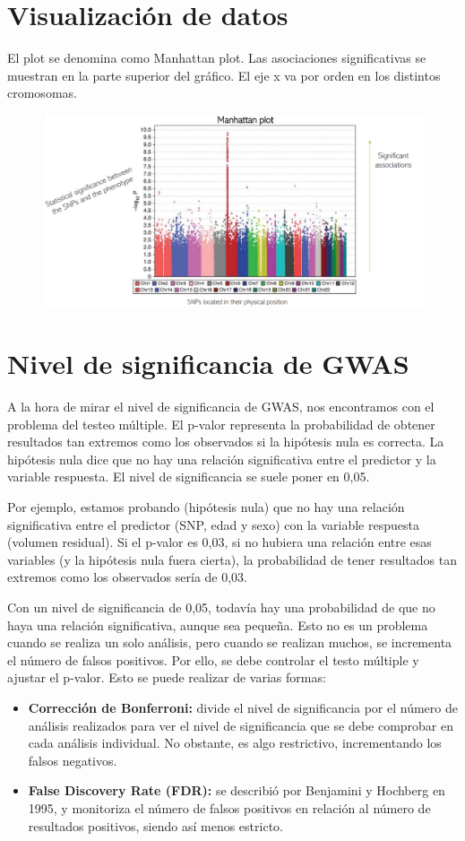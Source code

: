 \section{Visualización de datos}
El plot se denomina como Manhattan plot. Las asociaciones significativas se muestran en la parte superior del gráfico. El eje x va por orden en los distintos cromosomas. 

\begin{figure}[htbp]
\centering
\includegraphics[width = \textwidth]{figs/manhattan-plot.png}
\end{figure}

\section{Nivel de significancia de GWAS}
A la hora de mirar el nivel de significancia de GWAS, nos encontramos con el problema del testeo múltiple. El p-valor representa la probabilidad de obtener resultados tan extremos como los observados si la hipótesis nula es correcta. La hipótesis nula dice que no hay una relación significativa entre el predictor y la variable respuesta. El nivel de significancia se suele poner en 0,05. 

Por ejemplo, estamos probando (hipótesis nula) que no hay una relación significativa entre el predictor (SNP, edad y sexo) con la variable respuesta (volumen residual). Si el p-valor es 0,03, si no hubiera una relación entre esas variables (y la hipótesis nula fuera cierta), la probabilidad de tener resultados tan extremos como los observados sería de 0,03. 

Con un nivel de significancia de 0,05, todavía hay una probabilidad de que no haya una relación significativa, aunque sea pequeña. Esto no es un problema cuando se realiza un solo análisis, pero cuando se realizan muchos, se incrementa el número de falsos positivos. Por ello, se debe controlar el testo múltiple y ajustar el p-valor. Esto se puede realizar de varias formas:
\begin{itemize}
\item \textbf{Corrección de Bonferroni:} divide el nivel de significancia por el número de análisis realizados para ver el nivel de significancia que se debe comprobar en cada análisis individual. No obstante, es algo restrictivo, incrementando los falsos negativos.
\item \textbf{False Discovery Rate (FDR):} se describió por Benjamini y Hochberg en 1995, y monitoriza el número de falsos positivos en relación al número de resultados positivos, siendo así menos estricto.
\end{itemize}